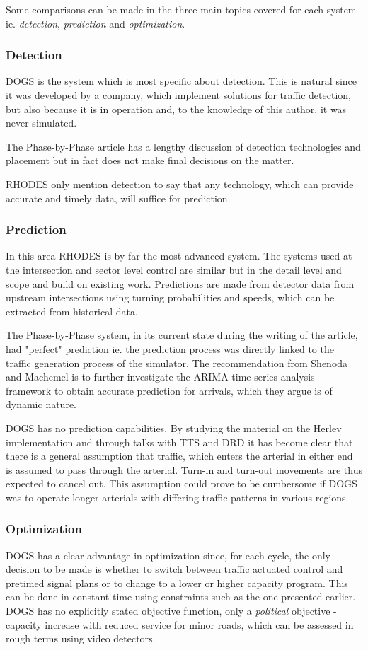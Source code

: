Some comparisons can be made in the three main topics covered for each system ie. \textit{detection}, \textit{prediction} and \textit{optimization}.

\subsubsection*{Detection}
DOGS is the system which is most specific about detection. This is natural since it was developed by a company, which implement solutions for traffic detection, but also because it is in operation and, to the knowledge of this author, it was never simulated.

The Phase-by-Phase article has a lengthy discussion of detection technologies and placement but in fact does not make final decisions on the matter.

RHODES only mention detection to say that any technology, which can provide accurate and timely data, will suffice for prediction.

\subsubsection*{Prediction}
In this area RHODES is by far the most advanced system. The systems used at the intersection and sector level control are similar but in the detail level and scope and build on existing work. Predictions are made from detector data from upstream intersections using turning probabilities and speeds, which can be extracted from historical data.

The Phase-by-Phase system, in its current state during the writing of the article, had "perfect" prediction ie. the prediction process was directly linked to the traffic generation process of the simulator. The recommendation from Shenoda and Machemel is to further investigate the ARIMA time-series analysis framework to obtain accurate prediction for arrivals, which they argue is of dynamic nature.

DOGS has no prediction capabilities. By studying the material on the Herlev implementation and through talks with TTS and DRD it has become clear that there is a general assumption that traffic, which enters the arterial in either end is assumed to pass through the arterial. Turn-in and turn-out movements are thus expected to cancel out. This assumption could prove to be cumbersome if DOGS was to operate longer arterials with differing traffic patterns in various regions.

\subsubsection*{Optimization}
DOGS has a clear advantage in optimization since, for each cycle, the only decision to be made is whether to switch between traffic actuated control and pretimed signal plans or to change to a lower or higher capacity program. This can be done in constant time using constraints such as the one presented earlier. DOGS has no explicitly stated objective function, only a \textit{political} objective - capacity increase with reduced service for minor roads, which can be assessed in rough terms using video detectors.

